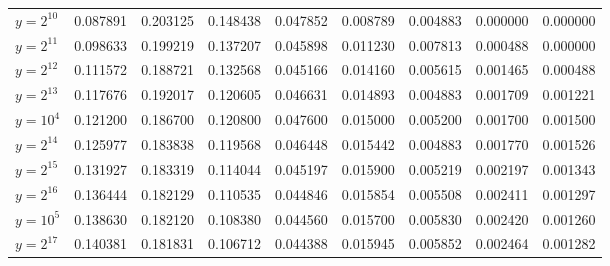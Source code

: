 \documentclass{article}
\theoremstyle{definition}
\begin{document}
\begin{table}[h!]
{\begin{tabular}{l|rrrrrrrr}
            \hline
            $y = 2^{10}$             & 0.087891 & 0.203125              & 0.148438              & 0.047852              & 0.008789              & 0.004883              & 0.000000              & 0.000000              \\
            $y = 2^{11}$             & 0.098633 & 0.199219              & 0.137207              & 0.045898              & 0.011230              & 0.007813              & 0.000488              & 0.000000              \\
            $y = 2^{12}$             & 0.111572 & 0.188721              & 0.132568              & 0.045166              & 0.014160              & 0.005615              & 0.001465              & 0.000488              \\
            $y = 2^{13}$             & 0.117676 & 0.192017              & 0.120605              & 0.046631              & 0.014893              & 0.004883              & 0.001709              & 0.001221              \\
            \hline
            $y = 10^{4}$             & 0.121200 & 0.186700              & 0.120800              & 0.047600              & 0.015000              & 0.005200              & 0.001700              & 0.001500              \\
            \hline
            $y = 2^{14}$             & 0.125977 & 0.183838              & 0.119568              & 0.046448              & 0.015442              & 0.004883              & 0.001770              & 0.001526              \\
            $y = 2^{15}$             & 0.131927 & 0.183319              & 0.114044              & 0.045197              & 0.015900              & 0.005219              & 0.002197              & 0.001343              \\
            $y = 2^{16}$             & 0.136444 & 0.182129              & 0.110535              & 0.044846              & 0.015854              & 0.005508              & 0.002411              & 0.001297              \\
            \hline
            $y = 10^{5}$             & 0.138630 & 0.182120              & 0.108380              & 0.044560              & 0.015700              & 0.005830              & 0.002420              & 0.001260              \\
            \hline
            $y = 2^{17}$             & 0.140381 & 0.181831              & 0.106712              & 0.044388              & 0.015945              & 0.005852              & 0.002464              & 0.001282              \\

\end{tabular}}
\end{table}
\end{document}
